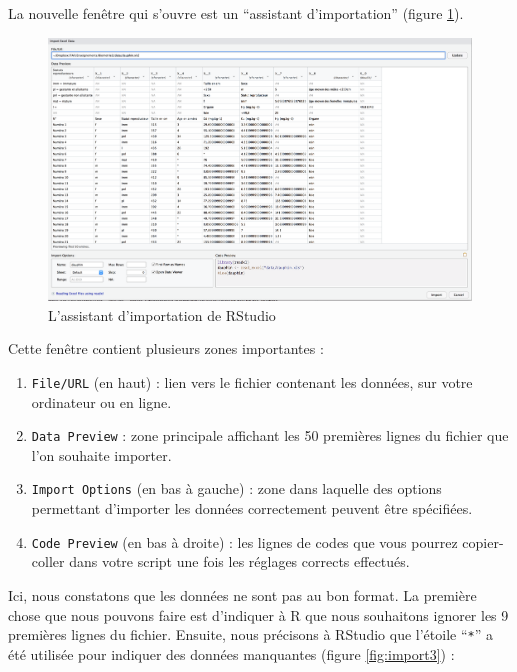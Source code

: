 \documentclass[a4paperpaper,]{article}
\providecommand{\tightlist}{%
  \setlength{\itemsep}{0pt}\setlength{\parskip}{0pt}}
\begin{document}
La nouvelle fenêtre qui s'ouvre est un ``assistant d'importation'' (figure \ref{fig:import2}).

\begin{figure}[htpb]

{\centering \includegraphics[width=1\linewidth]{images/import2} 

}

\caption{L'assistant d'importation de RStudio}\label{fig:import2}
\end{figure}

Cette fenêtre contient plusieurs zones importantes :

\begin{enumerate}
\def\labelenumi{\arabic{enumi}.}
\tightlist
\item
  \texttt{File/URL} (en haut) : lien vers le fichier contenant les données, sur votre ordinateur ou en ligne.
\item
  \texttt{Data\ Preview} : zone principale affichant les 50 premières lignes du fichier que l'on souhaite importer.
\item
  \texttt{Import\ Options} (en bas à gauche) : zone dans laquelle des options permettant d'importer les données correctement peuvent être spécifiées.
\item
  \texttt{Code\ Preview} (en bas à droite) : les lignes de codes que vous pourrez copier-coller dans votre script une fois les réglages corrects effectués.
\end{enumerate}

Ici, nous constatons que les données ne sont pas au bon format. La première chose que nous pouvons faire est d'indiquer à R que nous souhaitons ignorer les 9 premières lignes du fichier. Ensuite, nous précisons à RStudio que l'étoile ``\texttt{*}'' a été utilisée pour indiquer des données manquantes (figure \ref{fig:import3}) :
\end{document}
